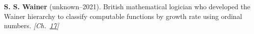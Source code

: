 \textbf{S. S. Wainer} (unknown–2021). British mathematical logician who developed the Wainer hierarchy to classify computable functions by growth rate using ordinal numbers. \emph{[Ch.~\hyperref[ch:bignumbers]{17}]}

